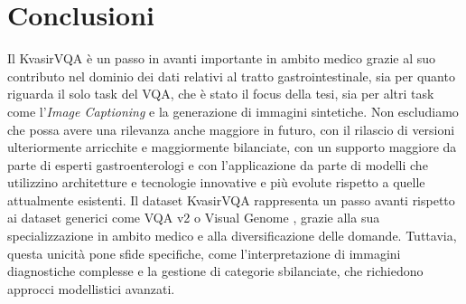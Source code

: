 \documentclass[../main.tex]{subfiles}
\begin{document}
\section{Conclusioni}

Il KvasirVQA è un passo in avanti importante in ambito medico grazie al suo contributo nel dominio dei dati relativi al tratto gastrointestinale, sia per quanto riguarda il solo task del VQA, che è stato il focus della tesi, sia per altri task come l'\textit{Image Captioning} e la generazione di immagini sintetiche. 
Non escludiamo che possa avere una rilevanza anche maggiore in futuro, con il rilascio di versioni ulteriormente arricchite e maggiormente bilanciate, con un supporto maggiore da parte di esperti gastroenterologi e con l'applicazione da parte di modelli che utilizzino architetture e tecnologie innovative e più evolute rispetto a quelle attualmente esistenti.
Il dataset KvasirVQA rappresenta un passo avanti rispetto ai dataset generici come VQA v2 \cite{DBLP:journals/corr/GoyalKSBP16} o Visual Genome \cite{DBLP:journals/corr/KrishnaZGJHKCKL16}, grazie alla sua specializzazione in ambito medico e alla diversificazione delle domande. Tuttavia, questa unicità pone sfide specifiche, come l'interpretazione di immagini diagnostiche complesse e la gestione di categorie sbilanciate, che richiedono approcci modellistici avanzati.
\end{document}
